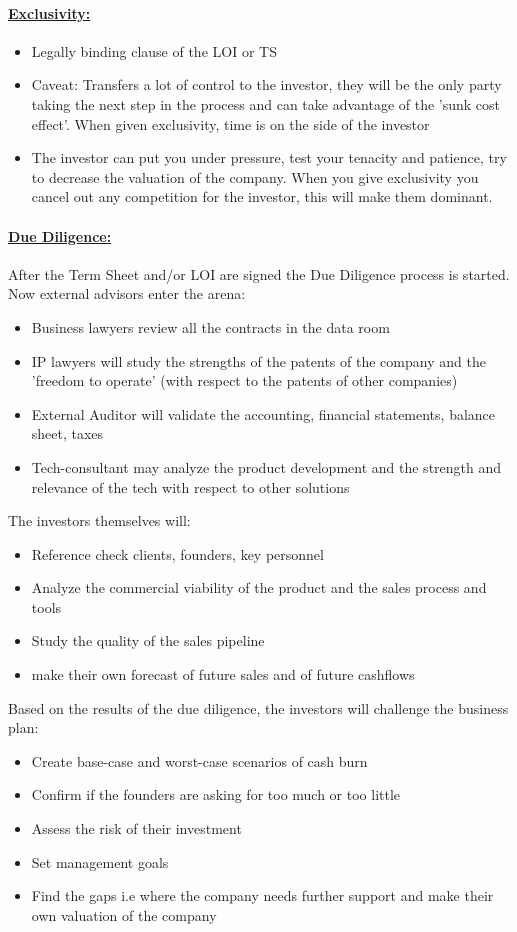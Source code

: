 \documentclass[8pt]{extreport}
\begin{document}
{\paragraph{\underline{Exclusivity:}}
\begin{itemize}
\item Legally binding clause of the LOI or TS
\item Caveat: Transfers a lot of control to the investor, they will be the only party taking the next step in the process and can take advantage of the 'sunk cost effect'. When given exclusivity, time is on the side of the investor
\item The investor can put you under pressure, test your tenacity and patience, try to decrease the valuation of the company. When you give exclusivity you cancel out any competition for the investor, this will make them dominant.
\end{itemize}
\paragraph{\underline{Due Diligence:}} After the Term Sheet and/or LOI are signed the Due Diligence process is started. Now external advisors enter the arena:
\begin{itemize}
\item Business lawyers review all the contracts in the data room
\item IP lawyers will study the strengths of the patents of the company and the 'freedom to operate' (with respect to the patents of other companies)
\item External Auditor will validate the accounting, financial statements, balance sheet, taxes
\item Tech-consultant may analyze the product development and the strength and relevance of the tech with respect to other solutions
\end{itemize}
The investors themselves will:
\begin{itemize}
\item Reference check clients, founders, key personnel
\item Analyze the commercial viability of the product and the sales process and tools
\item Study the quality of the sales pipeline
\item make their own forecast of future sales and of future cashflows
\end{itemize}
Based on the results of the due diligence, the investors will challenge the business plan:
\begin{itemize}
\item Create base-case and worst-case scenarios of cash burn
\item Confirm if the founders are asking for too much or too little
\item Assess the risk of their investment
\item Set management goals
\item Find the gaps i.e where the company needs further support and make their own valuation of the company
\end{itemize}
}
\end{document}
